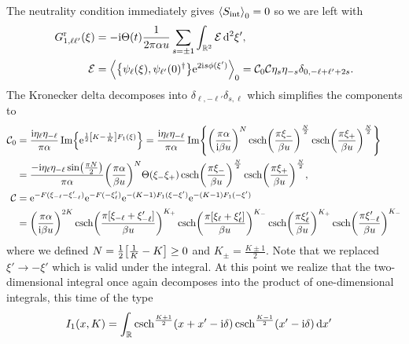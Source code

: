 \documentclass[english, parskip=full]{scrartcl}
\begin{document}
The neutrality condition immediately gives $\bra*{S_\Text{int}}_0 = 0$ so we are left with
\begin{align}
G_{1,\ell\ell'}^\r(\xi) &= -\i\Theta(t) \frac{1}{2\pi\alpha u} \sum_{s=\pm 1} \intrnd{2}{ \mathcal{E} }{\xi'},\\
\mathcal{E} &= \bra*{\klc*{\psi_\ell(\xi), \psi_{\ell'}(0)^\dagger} \powe{2\i s\phi(\xi')}}_0 = \mathcal{C}_0 \mathcal{C} \eta_s\eta_{-s} \delta_{0, -\ell + \ell' + 2s}.
\end{align}
The Kronecker delta decomposes into $\delta_{\ell,-\ell'} \delta_{s,\ell}$ which simplifies the components to
\begin{align}
\mathcal{C}_0 &= \frac{\i\eta_\ell\eta_{-\ell} }{\pi\alpha} \Im\klc*{\powe{\frac{1}{2} \klb*{K - \frac{1}{K}} F_1(\xi)}} = \frac{\i\eta_\ell\eta_{-\ell}}{\pi\alpha} \Im \klc*{ \kla*{\frac{\pi\alpha}{\i\beta u}}^N \csch\kla*{\frac{\pi\xi_-}{\beta u}}^\frac{N}{2} \csch\kla*{\frac{\pi\xi_+}{\beta u}}^\frac{N}{2} }\\
&= \frac{-\i\eta_\ell\eta_{-\ell} \sin\kla*{\frac{\pi N}{2}}}{\pi\alpha} \kla*{\frac{\pi\alpha}{\beta u}}^N \Theta(\xi_- \xi_+) \csch\kla*{\frac{\pi\xi_-}{\beta u}}^\frac{N}{2} \csch\kla*{\frac{\pi\xi_+}{\beta u}}^\frac{N}{2},\\
\mathcal{C} &= \powe{-F(\xi_{-\ell} - \xi'_{-\ell})} \powe{-F(-\xi'_{\ell})} \powe{-(K-1) F_1(\xi - \xi')} \powe{-(K-1) F_1(-\xi')}\\
&= \kla*{\frac{\pi\alpha}{\i\beta u}}^{2K} \csch\kla*{\frac{\pi [\xi_{-\ell} + \xi_{-\ell}']}{\beta u}}^{K_+} \csch\kla*{\frac{\pi [\xi_{\ell} + \xi_{\ell}']}{\beta u}}^{K_-} \csch\kla*{\frac{\pi \xi_{\ell}'}{\beta u}}^{K_+} \csch\kla*{\frac{\pi \xi_{-\ell}'}{\beta u}}^{K_-} 
\end{align}
where we defined $N=\frac{1}{2} \klb*{\frac{1}{K} - K}\ge 0$ and $K_\pm = \frac{K \pm 1}{2}$.
Note that we replaced $\xi'\rightarrow -\xi'$ which is valid under the integral.
At this point we realize that the two-dimensional integral once again decomposes into the product of one-dimensional integrals, this time of the type
\begin{align}
I_1(x,K) &= \intr{\csch^\frac{K+1}{2}\kla*{x+x' - \i\delta} \csch^\frac{K-1}{2}\kla*{x' - \i\delta}}{x'}
\end{align}
\end{document}
